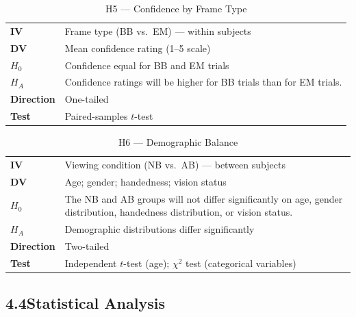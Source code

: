 \documentclass[11pt]{article}
\begin{document}
\begin{table}[H]
\centering\small
\caption*{H5 \;—\; Confidence by Frame Type}
\begin{tabularx}{\textwidth}{@{} l X @{}}
\toprule
\textbf{IV}        & Frame type (BB vs.\ EM) --- within subjects \\
\textbf{DV}        & Mean confidence rating (1--5 scale) \\
$H_0$              & Confidence equal for BB and EM trials \\
$H_A$              & Confidence ratings will be higher for BB trials than for EM trials. \\
\textbf{Direction} & One-tailed \\
\textbf{Test}      & Paired-samples $t$-test \\
\bottomrule
\end{tabularx}
\end{table}

\begin{table}[H]
\centering\small
\caption*{H6 \;—\; Demographic Balance}
\begin{tabularx}{\textwidth}{@{} l X @{}}
\toprule
\textbf{IV}        & Viewing condition (NB vs.\ AB) --- between subjects \\
\textbf{DV}        & Age; gender; handedness; vision status \\
$H_0$              & The NB and AB groups will not differ significantly on age, gender distribution, handedness distribution, or vision status. \\
$H_A$              & Demographic distributions differ significantly \\
\textbf{Direction} & Two-tailed \\
\textbf{Test}      & Independent $t$-test (age);\; $\chi^2$ test (categorical variables) \\
\bottomrule
\end{tabularx}
\end{table}

\subsection*{4.4\quad Statistical Analysis}
\end{document}
